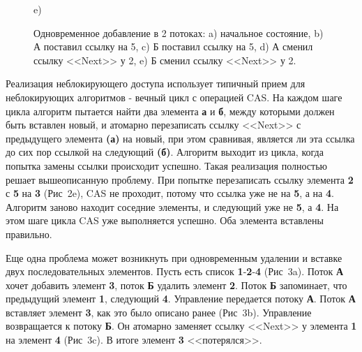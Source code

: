 \documentclass[12pt]{article}
\begin{document}
{\begin{figure}[h]
\begin{minipage}[h]{0.45\linewidth}
					\end{minipage}
					\begin{minipage}[h]{0.45\linewidth}
						 e) \\
					\end{minipage}
					\caption{Одновременное добавление в 2 потоках: a) начальное состояние, b) А поставил ссылку на 5, c) Б поставил ссылку на 5, d) А сменил ссылку <<Next>> у 2, e) Б сменил ссылку <<Next>> у 2.}
					\label{ris}
				\end{figure}
				\par Реализация неблокирующего доступа использует типичный прием для неблокирующих алгоритмов - вечный цикл с операцией CAS. На каждом шаге цикла алгоритм пытается найти два элемента \textbf{а} и \textbf{б}, между которыми должен быть вставлен новый, и атомарно перезаписать ссылку <<Next>> с предыдущего элемента \textbf{(а)} на новый, при этом сравнивая, является ли эта ссылка до сих пор ссылкой на следующий \textbf{(б)}. Алгоритм выходит из цикла, когда попытка замены ссылки происходит успешно. Такая реализация полностью решает вышеописанную проблему. При попытке перезаписать ссылку элемента \textbf{2} с \textbf{5} на \textbf{3}  (Рис~2e), CAS не проходит, потому что ссылка уже не на \textbf{5}, а на \textbf{4}. Алгоритм заново находит соседние элементы, и следующий уже не \textbf{5}, а \textbf{4}. На этом шаге цикла CAS уже выполняется успешно. Оба элемента вставлены правильно.
				\par Еще одна проблема может возникнуть при одновременным удалении и вставке двух последовательных элементов. Пусть есть список \textbf{1}-\textbf{2}-\textbf{4} (Рис~3a). Поток \textbf{А} хочет добавить элемент \textbf{3}, поток \textbf{Б} удалить элемент \textbf{2}. Поток \textbf{Б} запоминает, что предыдущий элемент \textbf{1}, следующий \textbf{4}. Управление передается потоку \textbf{А}. Поток \textbf{А} вставляет элемент \textbf{3}, как это было описано ранее (Рис~3b). Управление возвращается к потоку \textbf{Б}. Он атомарно заменяет ссылку <<Next>> у элемента \textbf{1} на элемент \textbf{4} (Рис~3c). В итоге элемент \textbf{3} <<потерялся>>.
}
\end{document}
